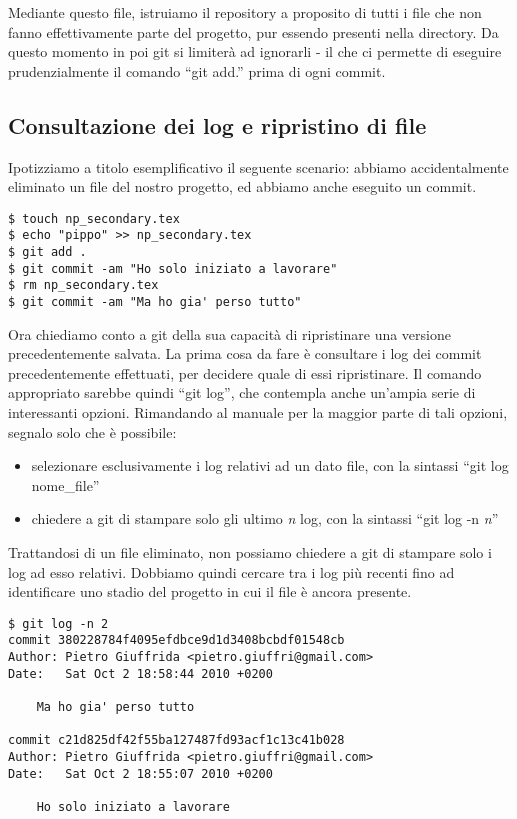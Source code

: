 \documentclass[a4paper,12pt,oneside]{article}
\begin{document}
Mediante questo file, istruiamo il repository a proposito di tutti i
file che non fanno effettivamente parte del progetto, pur essendo presenti
nella directory.
Da questo momento in poi git si limiterà ad ignorarli - il che ci permette di
eseguire prudenzialmente il comando ``git add.'' prima di ogni commit.

\subsection{Consultazione dei log e ripristino di file}
Ipotizziamo a titolo esemplificativo il seguente scenario:
abbiamo accidentalmente eliminato un file del nostro
progetto, ed abbiamo anche eseguito un commit.

\begin{lstlisting}
$ touch np_secondary.tex
$ echo "pippo" >> np_secondary.tex
$ git add .
$ git commit -am "Ho solo iniziato a lavorare"
$ rm np_secondary.tex
$ git commit -am "Ma ho gia' perso tutto"
\end{lstlisting}

Ora chiediamo conto a git della sua capacità di ripristinare una versione
precedentemente salvata. La prima cosa da fare è consultare i log dei commit
precedentemente effettuati, per decidere quale di essi ripristinare. Il comando
appropriato sarebbe quindi ``git log'', che contempla anche un'ampia serie di
interessanti opzioni. Rimandando al manuale per la maggior parte di tali
opzioni, segnalo solo che è possibile:
\begin{itemize}
\item selezionare esclusivamente i log relativi ad un dato file, con la
sintassi ``git log nome\_file''
\item chiedere a git di stampare solo gli ultimo \textit{n} log, con la
sintassi ``git log -n \textit{n}''
\end{itemize}

Trattandosi di un file eliminato, non possiamo chiedere a git di stampare solo i
log ad esso relativi. Dobbiamo quindi cercare tra i log più recenti fino ad
identificare uno stadio del progetto in cui il file è ancora presente.

\begin{lstlisting}
$ git log -n 2
commit 380228784f4095efdbce9d1d3408bcbdf01548cb
Author: Pietro Giuffrida <pietro.giuffri@gmail.com>
Date:   Sat Oct 2 18:58:44 2010 +0200

    Ma ho gia' perso tutto

commit c21d825df42f55ba127487fd93acf1c13c41b028
Author: Pietro Giuffrida <pietro.giuffri@gmail.com>
Date:   Sat Oct 2 18:55:07 2010 +0200

    Ho solo iniziato a lavorare
\end{lstlisting}
\end{document}
